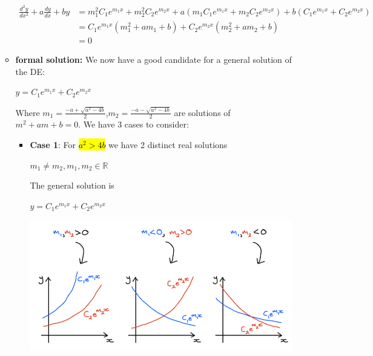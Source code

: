 \documentclass{article}
\begin{document}
\begin{enumerate}
\begin{itemize}
          \begin{align*}
            \frac{d^2 y}{dx^2} + a \frac{dy}{dx} + by &= m_1^2 C_1 e^{m_1 x} + m_2^2 C_2 e^{m_2 x} + a \left( m_1 C_1 e^{m_1 x} + m_2 C_2 e^{m_2 x} \right) + b \left( C_1 e^{m_1 x} + C_2 e^{m_2 x} \right) \\
            &= C_1 e^{m_1 x} \left( m_1^2 + a m_1 + b \right) + C_2 e^{m_2 x} \left( m_2^2 + a m_2 + b \right) \\
            &= 0
          \end{align*}


          \item \textbf{formal solution:} 
            We now have a good candidate for a general solution of the DE:
            \begin{center}
              $y =C_1e^{m_1x} + C_2e^{m_2x}$ 
            \end{center}
            Where $m_1 = \frac{-a + \sqrt{a^2-4b}}{2}$,$m_2 = \frac{-a - \sqrt{a^2-4b}}{2}$ are solutions of $m^2 + am +b = 0$. We have 3 cases to consider:



            \begin{itemize}
                \item \textbf{Case 1}: For \hl{$a^2 > 4b$} we have 2 distinct real solutions
                \begin{center}
                  $m_1 \neq m_2, m_1,m_2 \in \mathbb{R}$
                \end{center}
                The general solution is 
                \begin{center}
                  $y =C_1e^{m_1x} + C_2e^{m_2x}$
                \end{center}


                \includegraphics[width=\linewidth]{Graphs/w5_1.png}



\end{itemize}
\end{itemize}
\end{enumerate}
\end{document}
